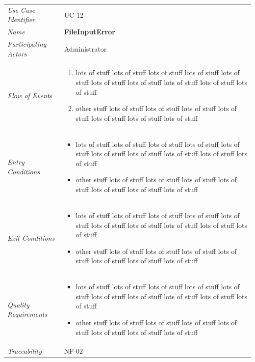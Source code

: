 \documentclass[12pt,letterpaper]{article}
\begin{document}
\begin{center}
	\begin{tabu} to 
		\toprule
		Use Case Identifier & UC-12 \\
		Name & {\bf FileInputError} \\
		Participating Actors & Administrator \\
		Flow of Events & 
	    \begin{enumerate}[topsep=-1em]
		    \item lots of stuff lots of stuff lots of stuff lots of stuff lots of stuff lots of stuff lots of stuff lots of stuff lots of stuff lots of stuff
		    \item other stuff lots of stuff lots of stuff lots of stuff lots of stuff lots of stuff lots of stuff lots of stuff
		\end{enumerate} \\

		Entry Conditions &
		\begin{itemize}[topsep=-1em]
		    \item lots of stuff lots of stuff lots of stuff lots of stuff lots of stuff lots of stuff lots of stuff lots of stuff lots of stuff lots of stuff
		    \item other stuff lots of stuff lots of stuff lots of stuff lots of stuff lots of stuff lots of stuff lots of stuff
        \end{itemize} \\

		Exit Conditions &
		\begin{itemize}[topsep=-1em]
		    \item lots of stuff lots of stuff lots of stuff lots of stuff lots of stuff lots of stuff lots of stuff lots of stuff lots of stuff lots of stuff
		    \item other stuff lots of stuff lots of stuff lots of stuff lots of stuff lots of stuff lots of stuff lots of stuff
        \end{itemize} \\

		Quality Requirements &
		\begin{itemize}[topsep=-1em]
		    \item lots of stuff lots of stuff lots of stuff lots of stuff lots of stuff lots of stuff lots of stuff lots of stuff lots of stuff lots of stuff
		    \item other stuff lots of stuff lots of stuff lots of stuff lots of stuff lots of stuff lots of stuff lots of stuff
        \end{itemize} \\

		Traceability & NF-02 \\
		\toprule
	\end{tabu}
\end{center}
\end{document}
